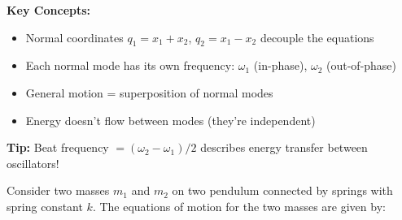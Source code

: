 \documentclass[11pt]{report}
\begin{document}
\begin{keybox}
\textbf{Key Concepts:}
\begin{itemize}
    \item Normal coordinates $q_1 = x_1 + x_2$, $q_2 = x_1 - x_2$ decouple the equations
    \item Each normal mode has its own frequency: $\omega_1$ (in-phase), $\omega_2$ (out-of-phase)
    \item General motion = superposition of normal modes
    \item Energy doesn't flow between modes (they're independent)
\end{itemize}
\textbf{Tip:} Beat frequency $= (\omega_2 - \omega_1)/2$ describes energy transfer between oscillators!
\end{keybox}
\begin{definition}
    Consider two masses \( m_1 \) and \( m_2 \) on two pendulum connected by springs with spring constant \( k \).  The equations of motion for the two masses are given by:


\end{definition}
\end{document}
